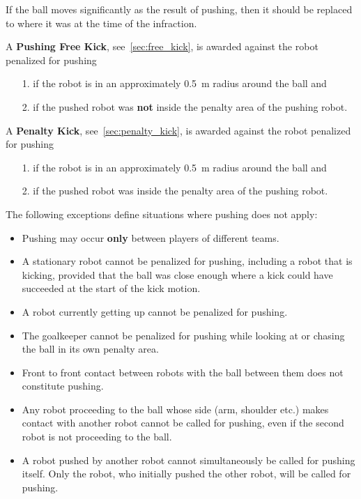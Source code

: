 If the ball moves significantly as the result of pushing, then it should be replaced to where it was at the time of the infraction.

A \textbf{Pushing Free Kick}, see~\cref{sec:free_kick}, is awarded against the robot penalized for pushing
\begin{itemize}
  \item[1.] if the robot is in an approximately \qty{0.5}{\metre} radius around the ball and
  \item[2.] if the pushed robot was \textbf{not} inside the penalty area of the pushing robot.
\end{itemize}

A \textbf{Penalty Kick}, see~\cref{sec:penalty_kick}, is awarded against the robot penalized for pushing
\begin{itemize}
  \item[1.] if the robot is in an approximately \qty{0.5}{\metre} radius around the ball and
  \item[2.] if the pushed robot was inside the penalty area of the pushing robot.
\end{itemize}

The following exceptions define situations where pushing does not apply:
\begin{itemize}
  \item Pushing may occur \textbf{only} between players of different teams.
  \item A stationary robot cannot be penalized for pushing, including a robot that is kicking, provided that the ball was close enough where a kick could have succeeded at the start of the kick motion.
  \item A robot currently getting up cannot be penalized for pushing.
  \item The goalkeeper cannot be penalized for pushing while looking at or chasing the ball in its own penalty area.
  \item Front to front contact between robots with the ball between them does not constitute pushing.
  \item Any robot proceeding to the ball whose side (\ie arm, shoulder etc.) makes contact with another robot cannot be called for pushing, even if the second robot is not proceeding to the ball.
  \item A robot pushed by another robot cannot simultaneously be called for pushing itself.
    Only the robot, who initially pushed the other robot, will be called for pushing.
\end{itemize}

